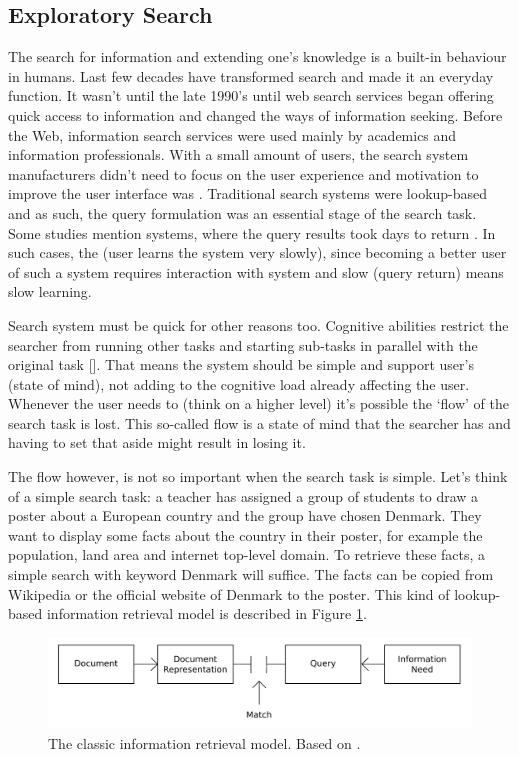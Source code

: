 \subsection{Exploratory Search}
The search for information and extending one's knowledge is a built-in behaviour in humans.
Last few decades have transformed search and made it an everyday function.
It wasn't until the late 1990's until web search services began offering quick access to information and changed the ways of information seeking.
Before the Web, information search services were used mainly by academics and information professionals.
With a small amount of users, the search system manufacturers didn't need to focus on the user experience and motivation to improve the user interface was .
Traditional search systems were lookup-based and as such, the query formulation was an essential stage of the search task.
Some studies mention systems, where the query results took days to return . In such cases, the (user learns the system very slowly), since becoming a better user of such a system requires interaction with system and slow (query return) means slow learning.

Search system must be quick for other reasons too. Cognitive abilities restrict the searcher from running other tasks and starting sub-tasks in parallel with the original task []. That means the system should be simple and support user's (state of mind), not adding to the cognitive load already affecting the user. Whenever the user needs to (think on a higher level) it's possible the ‘flow' of the search task is lost. This so-called flow is a state of mind that the searcher has and having to set that aside might result in losing it.

The flow however, is not so important when the search task is simple. Let's think of a simple search task: a teacher has assigned a group of students to draw a poster about a European country and the group have chosen Denmark. They want to display some facts about the country in their poster, for example the population, land area and internet top-level domain. To retrieve these facts, a simple search with keyword Denmark will suffice.
The facts can be copied from Wikipedia or the official website of Denmark to the poster.
This kind of lookup-based information retrieval model is described in Figure \ref{figure_classicIR}.

\begin{figure}[htp] %
\caption{The classic information retrieval model. Based on \protect\cite{bates89}.}
\label{figure_classicIR}
\centering
\includegraphics[scale=0.45]{figures/classicIR.pdf}
\end{figure}

